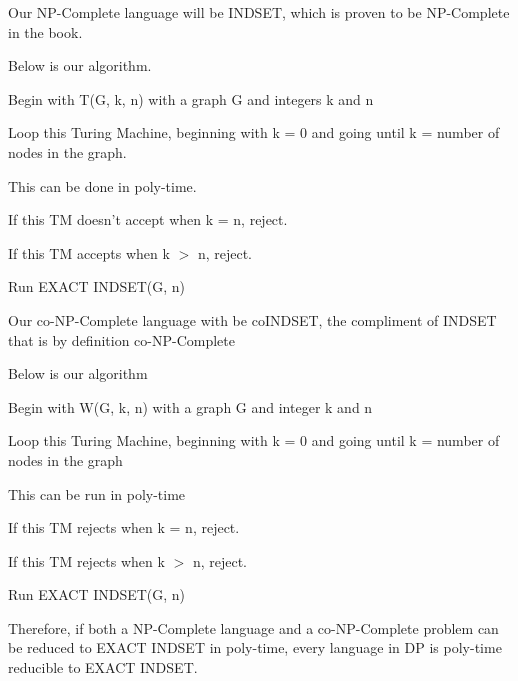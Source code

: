 \documentclass[12pt]{article}
\begin{document}
Our NP-Complete language will be INDSET, which is proven to be NP-Complete in the book.

Below is our algorithm.

Begin with T(G, k, n) with a graph G and integers k and n

Loop this Turing Machine, beginning with k = 0 and going until k = number of nodes in the graph.

This can be done in poly-time.

If this TM doesn't accept when k = n, reject.

If this TM accepts when k $>$ n, reject.

Run EXACT INDSET(G, n) 

Our co-NP-Complete language with be coINDSET, the compliment of INDSET that is by definition co-NP-Complete

Below is our algorithm

Begin with W(G, k, n) with a graph G and integer k and n

Loop this Turing Machine, beginning with k = 0 and going until k = number of nodes in the graph

This can be run in poly-time

If this TM rejects when k = n, reject.

If this TM rejects when k $>$ n, reject.

Run EXACT INDSET(G, n)

Therefore, if both a NP-Complete language and a co-NP-Complete problem can be reduced to EXACT INDSET in
poly-time, every language in DP is poly-time reducible to EXACT INDSET.
\end{document}
